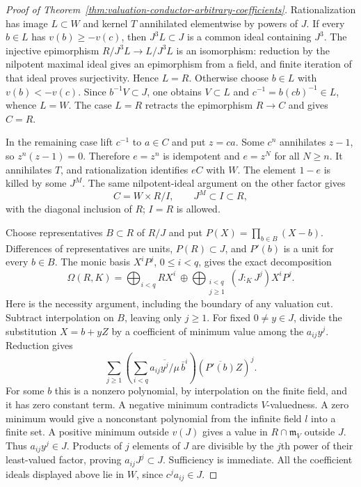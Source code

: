 \begin{proof}[Proof of Theorem~\ref{thm:valuation-conductor-arbitrary-coefficients}]
Rationalization has image $L\subset W$ and kernel $T$ annihilated
elementwise by powers of $J$. If every $b\in L$ has
$v(b)\ge-v(c)$, then $J^3L\subset J$ is a common ideal containing
$J^3$. The injective epimorphism
$R/J^3L\to L/J^3L$ is an isomorphism: reduction by the nilpotent
maximal ideal gives an epimorphism from a field, and finite iteration
of that ideal proves surjectivity. Hence $L=R$. Otherwise choose
$b\in L$ with $v(b)<-v(c)$. Since $b^{-1}V\subset J$, one obtains
$V\subset L$ and $c^{-1}=b(cb)^{-1}\in L$, whence $L=W$.
The case $L=R$ retracts the epimorphism $R\to C$ and gives $C=R$.

In the remaining case lift $c^{-1}$ to $a\in C$ and put $z=ca$.
Some $c^n$ annihilates $z-1$, so $z^n(z-1)=0$. Therefore $e=z^n$
is idempotent and $e=z^N$ for all $N\ge n$. It annihilates $T$,
and rationalization identifies $eC$ with $W$. The element $1-e$ is
killed by some $J^M$. The same nilpotent-ideal argument on the other
factor gives
\begin{equation}\label{eq:valuation-coefficient-splitting}
                 C=W\times R/I,\qquad J^M\subset I\subset R,
\end{equation}
with the diagonal inclusion of $R$; $I=R$ is allowed.

Choose representatives $B\subset R$ of $R/J$ and put
$P(X)=\prod_{b\in B}(X-b)$. Differences of representatives are
units, $P(R)\subset J$, and $P'(b)$ is a unit for every $b\in B$.
The monic basis $X^iP^j$, $0\le i<q$, gives the exact decomposition
\begin{equation}\label{eq:valuation-conductor-coefficients}
 \Omega(R,K)=\bigoplus_{i<q}RX^i\ \oplus\!
 \bigoplus_{\substack{i<q\\j\ge1}}(J:_KJ^j)X^iP^j.
\end{equation}
Here is the necessity argument, including the boundary of any
valuation cut. Subtract interpolation on $B$, leaving only $j\ge1$.
For fixed $0\ne y\in J$, divide the substitution $X=b+yZ$ by a
coefficient of minimum value among the $a_{ij}y^j$. Reduction gives
\[
 \sum_{j\ge1}\left(\sum_{i<q}\overline{a_{ij}y^j/\mu}\,\bar b^i\right)
                         (\overline{P'(b)}Z)^j.
\]
For some $b$ this is a nonzero polynomial, by interpolation on the
finite field, and it has zero constant term. A negative minimum
contradicts $V$-valuedness. A zero minimum would give a nonconstant
polynomial from the infinite field $l$ into a finite set. A positive
minimum outside $v(J)$ gives a value in $R\cap\mathfrak m_V$ outside
$J$. Thus $a_{ij}y^j\in J$. Products of $j$ elements of $J$ are
divisible by the $j$th power of their least-valued factor, proving
$a_{ij}J^j\subset J$. Sufficiency is immediate. All the coefficient
ideals displayed above lie in $W$, since $c^ja_{ij}\in J$.


\end{proof}
